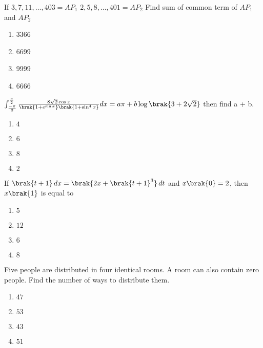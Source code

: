 \item If $3, 7, 11, \ldots, 403 = AP_1\,\, 2, 5, 8, \ldots, 401 = AP_2$ Find sum of common term of $AP_1$ and $AP_2$  \hfill {}

\begin{multicols}{4}
    \begin{enumerate}
        \item 3366
        \item 6699
        \item 9999
        \item 6666
    \end{enumerate}
\end{multicols}

\item $\int_\frac{-\pi}{2}^\frac{\pi}{2} \frac{8\sqrt{2}\cos x}{\brak{1 + e^{\sin x}}\brak{1 + \sin^4x}}dx = a\pi + b\log\brak{3 + 2\sqrt{2}}$ then find a + b.  \hfill {}

\begin{multicols}{4}
\begin{enumerate}
    \item $4$
    \item $6$
    \item $8$
    \item $2$
\end{enumerate}
\end{multicols}


\item If $\brak{t+ 1}\,dx = \brak{2x + \brak{t+ 1}^3}\,dt$ and $x\brak{0} = 2$, then $x\brak{1}$ is equal to  \hfill {}

\begin{multicols}{4}
\begin{enumerate}
    \item $5$
    \item $12$
    \item $6$
    \item $8$
\end{enumerate}
\end{multicols}



\item Five people are distributed in four identical rooms. A room can also contain zero people. Find the number of ways to distribute them. \hfill {}
\begin{multicols}{4}
\begin{enumerate}
    \item $47$
    \item $53$
    \item $43$
    \item $51$
\end{enumerate}
\end{multicols}



